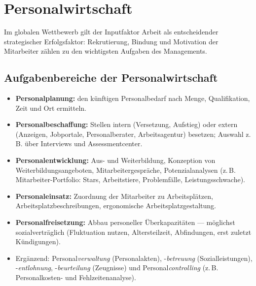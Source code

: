 \documentclass[11pt, a4paper]{article}
\begin{document}
\section{Personalwirtschaft}

Im globalen Wettbewerb gilt der Inputfaktor Arbeit als entscheidender strategischer
Erfolgsfaktor: Rekrutierung, Bindung und Motivation der Mitarbeiter zählen zu den
wichtigsten Aufgaben des Managements.

\subsection{Aufgabenbereiche der Personalwirtschaft}

\begin{itemize}
  \item \textbf{Personalplanung:} den künftigen Personalbedarf nach Menge, Qualifikation,
    Zeit und Ort ermitteln.
  \item \textbf{Personalbeschaffung:} Stellen intern (Versetzung, Aufstieg) oder extern
    (Anzeigen, Jobportale, Personalberater, Arbeitsagentur) besetzen; Auswahl z.\,B. über
    Interviews und Assessmentcenter.
  \item \textbf{Personalentwicklung:} Aus- und Weiterbildung, Konzeption von
    Weiterbildungsangeboten, Mitarbeitergespräche, Potenzialanalysen
    (z.\,B. Mitarbeiter-Portfolio: Stars, Arbeitstiere, Problemfälle, Leistungsschwache).
  \item \textbf{Personaleinsatz:} Zuordnung der Mitarbeiter zu Arbeitsplätzen,
    Arbeitsplatzbeschreibungen, ergonomische Arbeitsplatzgestaltung.
  \item \textbf{Personalfreisetzung:} Abbau personeller Überkapazitäten --- möglichst
    sozialverträglich (Fluktuation nutzen, Altersteilzeit, Abfindungen, erst zuletzt
    Kündigungen).
  \item Ergänzend: Personal\emph{verwaltung} (Personalakten), -\emph{betreuung}
    (Sozialleistungen), -\emph{entlohnung}, -\emph{beurteilung} (Zeugnisse) und
    Personal\emph{controlling} (z.\,B. Personalkosten- und Fehlzeitenanalyse).
\end{itemize}
\end{document}
